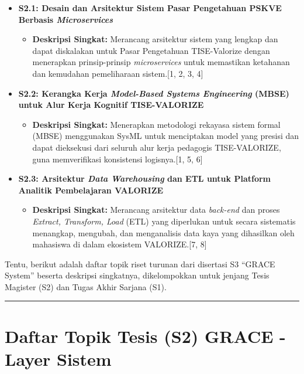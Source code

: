 \documentclass[
  letterpaper,
  DIV=11,
  numbers=noendperiod]{scrreprt}
\providecommand{\tightlist}{%
  \setlength{\itemsep}{0pt}\setlength{\parskip}{0pt}}
\begin{document}
\begin{itemize}
\tightlist
\item
  \textbf{S2.1: Desain dan Arsitektur Sistem Pasar Pengetahuan PSKVE
  Berbasis \emph{Microservices}}

  \begin{itemize}
  \tightlist
  \item
    \textbf{Deskripsi Singkat:} Merancang arsitektur sistem yang lengkap
    dan dapat diskalakan untuk Pasar Pengetahuan TISE-Valorize dengan
    menerapkan prinsip-prinsip \emph{microservices} untuk memastikan
    ketahanan dan kemudahan pemeliharaan sistem.{[}1, 2, 3, 4{]}
  \end{itemize}
\item
  \textbf{S2.2: Kerangka Kerja \emph{Model-Based Systems Engineering}
  (MBSE) untuk Alur Kerja Kognitif TISE-VALORIZE}

  \begin{itemize}
  \tightlist
  \item
    \textbf{Deskripsi Singkat:} Menerapkan metodologi rekayasa sistem
    formal (MBSE) menggunakan SysML untuk menciptakan model yang presisi
    dan dapat dieksekusi dari seluruh alur kerja pedagogis
    TISE-VALORIZE, guna memverifikasi konsistensi logisnya.{[}1, 5, 6{]}
  \end{itemize}
\item
  \textbf{S2.3: Arsitektur \emph{Data Warehousing} dan ETL untuk
  Platform Analitik Pembelajaran VALORIZE}

  \begin{itemize}
  \tightlist
  \item
    \textbf{Deskripsi Singkat:} Merancang arsitektur data
    \emph{back-end} dan proses \emph{Extract, Transform, Load} (ETL)
    yang diperlukan untuk secara sistematis menangkap, mengubah, dan
    menganalisis data kaya yang dihasilkan oleh mahasiswa di dalam
    ekosistem VALORIZE.{[}7, 8{]}
  \end{itemize}
\end{itemize}

Tentu, berikut adalah daftar topik riset turunan dari disertasi S3
``GRACE System'' beserta deskripsi singkatnya, dikelompokkan untuk
jenjang Tesis Magister (S2) dan Tugas Akhir Sarjana (S1).

\begin{center}\rule{0.5\linewidth}{0.5pt}\end{center}

\section{\texorpdfstring{\textbf{Daftar Topik Tesis (S2) GRACE - Layer
Sistem}}{Daftar Topik Tesis (S2) GRACE - Layer Sistem}}\label{daftar-topik-tesis-s2-grace---layer-sistem}
\end{document}
